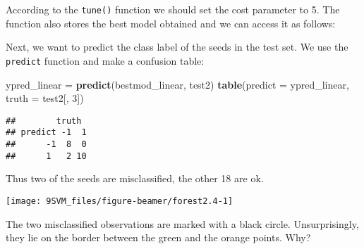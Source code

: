 \documentclass[10pt,ignorenonframetext,]{beamer}
\newenvironment{Shaded}{\begin{snugshade}}{\end{snugshade}}
\newcommand{\KeywordTok}[1]{\textcolor[rgb]{0.13,0.29,0.53}{\textbf{#1}}}
\newcommand{\DataTypeTok}[1]{\textcolor[rgb]{0.13,0.29,0.53}{#1}}
\newcommand{\DecValTok}[1]{\textcolor[rgb]{0.00,0.00,0.81}{#1}}
\newcommand{\StringTok}[1]{\textcolor[rgb]{0.31,0.60,0.02}{#1}}
\newcommand{\OperatorTok}[1]{\textcolor[rgb]{0.81,0.36,0.00}{\textbf{#1}}}
\newcommand{\NormalTok}[1]{#1}
\begin{document}
\begin{frame}[fragile]

According to the \texttt{tune()} function we should set the cost
parameter to 5. The function also stores the best model obtained and we
can access it as follows:

\scriptsize

\begin{Shaded}
\end{Shaded}

\normalsize
Next, we want to predict the class label of the seeds in the test set.
We use the \texttt{predict} function and make a confusion table:

\scriptsize

\begin{Shaded}
\begin{Highlighting}[]
\NormalTok{ypred_linear =}\StringTok{ }\KeywordTok{predict}\NormalTok{(bestmod_linear, test2)}
\KeywordTok{table}\NormalTok{(}\DataTypeTok{predict =}\NormalTok{ ypred_linear, }\DataTypeTok{truth =}\NormalTok{ test2[, }\DecValTok{3}\NormalTok{])}
\end{Highlighting}
\end{Shaded}

\begin{verbatim}
##        truth
## predict -1  1
##      -1  8  0
##      1   2 10
\end{verbatim}

\normalsize

Thus two of the seeds are misclassified, the other 18 are ok.

\end{frame}

\begin{frame}

\footnotesize

\begin{center}\texttt{[image: 9SVM\_files/figure-beamer/forest2.4-1]} \end{center}

\normalsize

The two misclassified observations are marked with a black circle.
Unsurprisingly, they lie on the border between the green and the orange
points. Why?

\end{frame}
\end{document}
